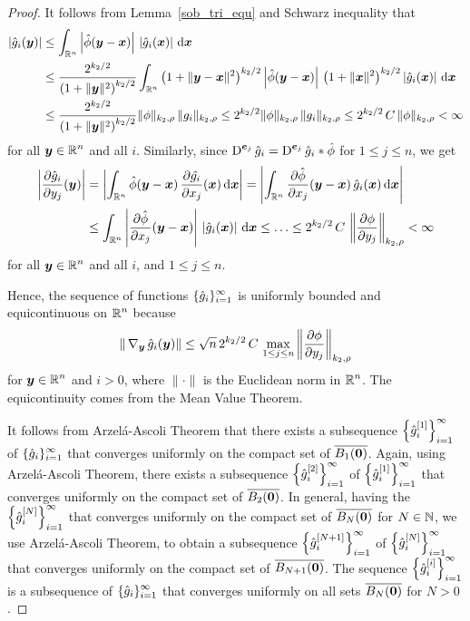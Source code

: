 \begin{proof}
It follows from Lemma~\ref{sob_tri_equ} and Schwarz inequality that
\begin{align*}
\left|\hat{g}_i({\bm{y}})\right| &\leq
\int_{\mathbb{R}^n} \left| \hat{\phi}({\bm{y}}-{\bm{x}})\right|\,
\left| \hat{g}_i({\bm{x}}) \right| \,\mathrm{d}{{\bm{x}}} \\
&\leq \frac{2^{k_2/2}}{\left(1+\|{\bm{y}}\|^2\right)^{k_2/2}}
\int_{\mathbb{R}^n} \left(1+\|{\bm{y}}-{\bm{x}}\|^2\right)^{k_2/2}
\left| \hat{\phi}({\bm{y}}-{\bm{x}})\right|\,
\left(1+\|{\bm{x}}\|^2\right)^{k_2/2} \left| \hat{g}_i({\bm{x}}) \right|
\,\mathrm{d}{{\bm{x}}} \\
&\leq \frac{2^{k_2/2}}{\left(1+\|{\bm{y}}\|^2\right)^{k_2/2}} \|\phi\|_{k_2,\rho}
\, \|g_i\|_{k_2,\rho}
\leq 2^{k_2/2}\|\phi\|_{k_2,\rho}\, \|g_i\|_{k_2,\rho} \leq
2^{k_2/2}\,C\,\|\phi\|_{k_2,\rho} < \infty
\end{align*}
for all $\displaystyle {\bm{y}}\in \mathbb{R}^n$ and all $i$.  Similarly,
since $\displaystyle \operatorname{D}^{{\bm{e}}_j} \hat{g}_i
= \operatorname{D}^{{\bm{e}}_j} \hat{g}_i \ast \hat{\phi}$ for $1 \leq j \leq n$, we get
\begin{align*}
\left|\frac{\partial{\hat{g}_i}}{\partial y_j}({\bm{y}})\right| &=
\left| \int_{\mathbb{R}^n} \hat{\phi}({\bm{y}}-{\bm{x}})\,
\frac{\partial{\hat{g_i}}}{\partial x_j}({\bm{x}}) \,\mathrm{d}{{\bm{x}}} \right|
= \left| \int_{\mathbb{R}^n} \frac{\partial{\hat{\phi}}}{\partial x_j}({\bm{y}}-{\bm{x}})\,
\hat{g}_i({\bm{x}}) \,\mathrm{d}{{\bm{x}}} \right| \\
&\leq \int_{\mathbb{R}^n} \left| \frac{\partial{\hat{\phi}}}{\partial x_j}({\bm{y}}-{\bm{x}})\right|\,
\left|\hat{g}_i({\bm{x}})\right| \,\mathrm{d}{{\bm{x}}} \leq \ldots 
\leq 2^{k_2/2}\,C\,\left\|\frac{\partial{\phi}}{\partial y_j}\right\|_{k_2,\rho} < \infty
\end{align*}
for all $\displaystyle {\bm{y}}\in \mathbb{R}^n$ and all $i$, and $1 \leq j \leq n$.

Hence, the sequence of functions $\displaystyle \{\hat{g}_i\}_{i=1}^\infty$ is
uniformly bounded and equicontinuous on $\displaystyle \mathbb{R}^n$ because
\[
\| \operatorname{\nabla}_{{\bm{y}}} \hat{g}_i({\bm{y}}) \| \leq
\sqrt{n}\,2^{k_2/2}\,C
\,\max_{1\leq j\leq n} \left\|\frac{\partial{\phi}}{\partial y_j}\right\|_{k_2,\rho}
\]
for $\displaystyle {\bm{y}}\in \mathbb{R}^n$ and $i > 0$,
where $\|\cdot\|$ is the Euclidean norm in $\displaystyle \mathbb{R}^n$.  The
equicontinuity comes from the Mean Value Theorem.

It follows from Arzel\'a-Ascoli Theorem that there exists a subsequence
$\displaystyle \left\{ \hat{g}_i^{[1]}\right\}_{i=1}^\infty$ of
$\displaystyle \{\hat{g}_i\}_{i=1}^\infty$ that
converges uniformly on the compact set of $\overline{B_1({\bm{0}})}$.  Again,
using Arzel\'a-Ascoli Theorem, there exists a subsequence
$\displaystyle \left\{ \hat{g}_{i}^{[2]}\right\}_{i=1}^\infty$ of
$\displaystyle \left\{ \hat{g}_i^{[1]}\right\}_{i=1}^\infty$ that
converges uniformly on the compact set of $\overline{B_2({\bm{0}})}$.
In general,
having the $\displaystyle \left\{\hat{g}_i^{[N]}\right\}_{i=1}^\infty$
that converges uniformly on the compact set of
$\overline{B_N({\bm{0}})}$ for $N \in \mathbb{N}$,
we use Arzel\'a-Ascoli Theorem, to obtain a subsequence
$\displaystyle \left\{ \hat{g}_i^{[N+1]}\right\}_{i=1}^\infty$ of
$\displaystyle \left\{\hat{g}_i^{[N]}\right\}_{i=1}^\infty$ that
converges uniformly on the compact set of $\overline{B_{N+1}({\bm{0}})}$.
The sequence $\displaystyle \left\{ \hat{g}_i^{[i]}\right\}_{i=1}^\infty$ is a
subsequence of $\displaystyle \{\hat{g}_i\}_{i=1}^\infty$ that
converges uniformly on all sets $\overline{B_N({\bm{0}})}$ for $N > 0$.


\end{proof}

